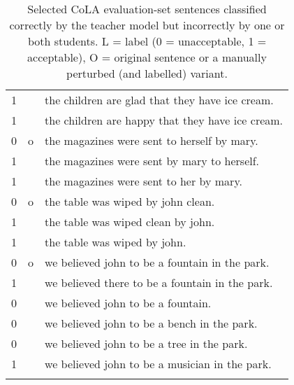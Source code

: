 \begin{center}
\begin{longtable}{p{0.5cm}p{0.5cm}p{15cm}}
1 &   & the children are glad that they have ice cream. \\
1 &   & the children are happy that they have ice cream. \\
0 & o & the magazines were sent to herself by mary. \\
1 &   & the magazines were sent by mary to herself. \\
1 &   & the magazines were sent to her by mary. \\
0 & o & the table was wiped by john clean. \\
1 &   & the table was wiped clean by john. \\
1 &   & the table was wiped by john. \\
0 & o & we believed john to be a fountain in the park. \\
1 &   & we believed there to be a fountain in the park. \\
0 &   & we believed john to be a fountain. \\
0 &   & we believed john to be a bench in the park. \\
0 &   & we believed john to be a tree in the park. \\
1 &   & we believed john to be a musician in the park. \\
\bottomrule
\caption{Selected CoLA evaluation-set sentences classified correctly by the teacher model but incorrectly by one or both students. L = label (0 = unacceptable, 1 = acceptable), O = original sentence or a manually perturbed (and labelled) variant.}
\label{tab:own-CoLA-diagnostics}
\end{longtable}
\end{center}
